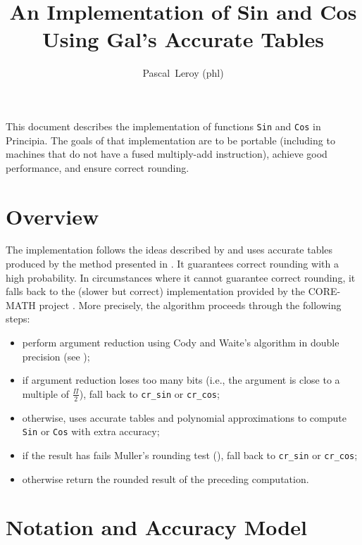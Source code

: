\documentclass[10pt, a4paper, twoside]{basestyle}
\title{An Implementation of Sin and Cos Using Gal's Accurate Tables}
\date{\printdate{2025-09-14}}
\author{Pascal~Leroy (phl)}
\begin{document}
\maketitle
\begin{sloppypar}
\noindent
This document describes the implementation of functions \texttt{Sin} and \texttt{Cos} in Principia.  The goals of that implementation are to be portable (including to machines that do not have a fused multiply-add instruction), achieve good performance, and ensure correct rounding.
\end{sloppypar}

\section*{Overview}

The implementation follows the ideas described by \cite{GalBachelis1991} and uses accurate tables produced by the method presented in \cite{StehléZimmermann2005}.  It guarantees correct rounding with a high probability.  In circumstances where it cannot guarantee correct rounding, it falls back to the (slower but correct) implementation provided by the CORE-MATH project \cite{SibidanovZimmermannGlondu2022} \cite{ZimmermannSibidanovGlondu2024}.  More precisely, the algorithm proceeds through the following steps:
\begin{itemize}[nosep]
\item perform argument reduction using Cody and Waite's algorithm in double precision (see \cite[379]{MullerBrisebarreDeDinechinJeannerodLefevreMelquiondRevolStehleTorres2010});
\item if argument reduction loses too many bits (i.e., the argument is close to a multiple of $\frac{\Pi}{2}$), fall back to \texttt{cr\_sin} or \texttt{cr\_cos};
\item otherwise, uses accurate tables and polynomial approximations to compute \texttt{Sin} or \texttt{Cos} with extra accuracy;
\item if the result has fails Muller's rounding test (\cite[397-400]{MullerBrisebarreDeDinechinJeannerodLefevreMelquiondRevolStehleTorres2010}), fall back to \texttt{cr\_sin} or \texttt{cr\_cos};
\item otherwise return the rounded result of the preceding computation.
\end{itemize}

\section*{Notation and Accuracy Model} 
\end{document}
